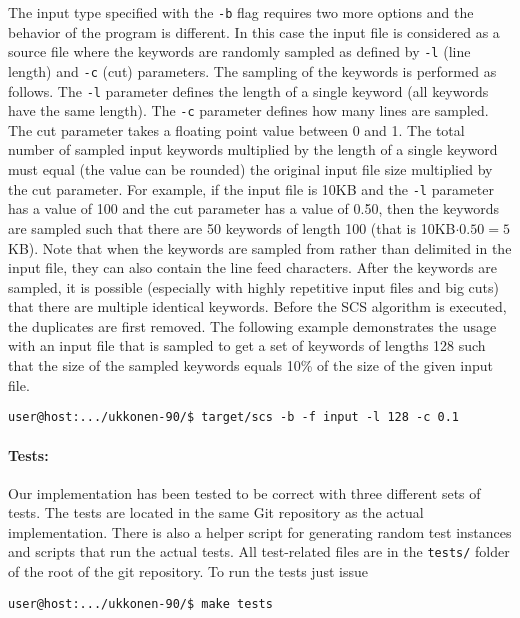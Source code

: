 \documentclass[english,twoside,censored,csm,algorithms-track-2020]{HYthesisML}
\theoremstyle{plain}
\theoremstyle{definition}
\begin{document}
The input type specified with the \texttt{-b} flag requires two more options and the behavior of
the program is
different. In this case the input file is considered as a source file where the keywords are randomly
sampled as defined by \texttt{-l} (line length) and \texttt{-c} (cut) parameters.
The sampling of the keywords is
performed as follows. The \texttt{-l} parameter defines the length of a single keyword (all keywords have
the same length). The \texttt{-c} parameter defines how many lines are sampled. The cut parameter takes a
floating point value between 0 and 1. The total number of sampled input keywords multiplied by
the length of a single keyword must equal (the value can be rounded) the original input file size
multiplied by the cut parameter. For example, if the input file is 10KB and the \texttt{-l}
parameter has a value
of 100 and the cut parameter has a value of 0.50, then the keywords are sampled such that there
are 50 keywords of length 100 (that is 10KB$\cdot 0.50 = 5$KB). Note that when the
keywords are sampled from rather than delimited in the input file, they can also contain the line
feed characters. After the keywords are sampled, it is possible (especially with highly repetitive
input files and big cuts) that there are multiple identical keywords. Before the SCS algorithm
is executed, the duplicates are first removed. The following example
demonstrates the usage with an input file that is sampled to get a set of keywords of lengths 128
such that the size of the sampled keywords equals 10\% of the size of the given input file.

\begin{verbatim}
user@host:.../ukkonen-90/$ target/scs -b -f input -l 128 -c 0.1
\end{verbatim}

\paragraph{Tests:}
Our implementation has been tested to be correct with three different sets of tests. The tests are
located in the same Git repository as the actual implementation. There is also a helper script for
generating random test instances and scripts that run the actual tests.
All test-related files are in the \texttt{tests/} folder of the
root of the git repository. To run the tests just issue

\begin{verbatim}
user@host:.../ukkonen-90/$ make tests
\end{verbatim}
\end{document}
